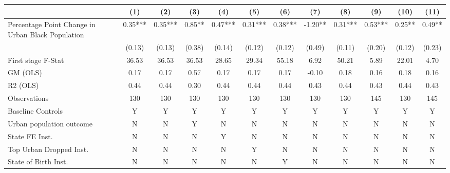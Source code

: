  \begin{tabular}{l*{11}{c}} \toprule
                    &\multicolumn{1}{c}{(1)}   &\multicolumn{1}{c}{(2)}   &\multicolumn{1}{c}{(3)}   &\multicolumn{1}{c}{(4)}   &\multicolumn{1}{c}{(5)}   &\multicolumn{1}{c}{(6)}   &\multicolumn{1}{c}{(7)}   &\multicolumn{1}{c}{(8)}   &\multicolumn{1}{c}{(9)}   &\multicolumn{1}{c}{(10)}   &\multicolumn{1}{c}{(11)}   \\
\midrule
Percentage Point Change in Urban Black Population&     0.35***&     0.35***&     0.85** &     0.47***&     0.31***&     0.38***&    -1.20** &     0.31***&     0.53***&     0.25** &     0.49** \\
                    &   (0.13)   &   (0.13)   &   (0.38)   &   (0.14)   &   (0.12)   &   (0.12)   &   (0.49)   &   (0.11)   &   (0.20)   &   (0.12)   &   (0.23)   \\
\midrule
First stage F-Stat  &    36.53   &    36.53   &    36.53   &    28.65   &    29.34   &    55.18   &     6.92   &    50.21   &     5.89   &    22.01   &     4.70   \\
GM (OLS)            &     0.17   &     0.17   &     0.57   &     0.17   &     0.17   &     0.17   &    -0.10   &     0.18   &     0.16   &     0.18   &     0.16   \\
R2 (OLS)            &     0.44   &     0.44   &     0.30   &     0.44   &     0.44   &     0.44   &     0.43   &     0.44   &     0.43   &     0.44   &     0.43   \\
Observations        &      130   &      130   &      130   &      130   &      130   &      130   &      130   &      130   &      145   &      130   &      145   \\
Baseline Controls   &        Y   &        Y   &        Y   &        Y   &        Y   &        Y   &        Y   &        Y   &        Y   &        Y   &        Y   \\
Urban population outcome&        N   &        N   &        Y   &        N   &        N   &        N   &        N   &        N   &        N   &        N   &        N   \\
State FE Inst.      &        N   &        N   &        N   &        Y   &        N   &        N   &        N   &        N   &        N   &        N   &        N   \\
Top Urban Dropped Inst.&        N   &        N   &        N   &        N   &        Y   &        N   &        N   &        N   &        N   &        N   &        N   \\
State of Birth Inst.&        N   &        N   &        N   &        N   &        N   &        Y   &        N   &        N   &        N   &        N   &        N   \\

\end{tabular}
